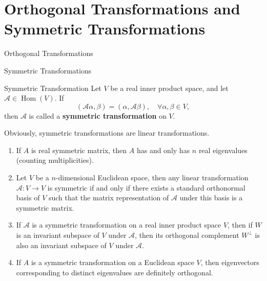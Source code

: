 \documentclass[11pt]{../../TexTemplate/elegantbook} %
\begin{document}
\section{Orthogonal Transformations and Symmetric Transformations}
\begin{leftbarTitle}{Orthogonal Transformations}\end{leftbarTitle}
\begin{leftbarTitle}{Symmetric Transformations}\end{leftbarTitle}
\begin{definition}{Symmetric Transformation}
    Let \( V \) be a real inner product space, 
    and let \( \mathcal{A}\in \operatorname{Hom}(V) \).
    If
    \[
    (\mathcal{A}\alpha, \beta) = (\alpha, \mathcal{A}\beta), \quad \forall \alpha, \beta \in V,
    \]
    then \( \mathcal{A} \) is called a \textbf{symmetric transformation} on \( V \).
\end{definition}
Obviously, symmetric transformations are linear transformations.

\begin{lemma}
    \begin{enumerate}
        \item If \( A \) is real symmetric matrix, then \( A \) has and only has \( n \) real eigenvalues (counting multiplicities). 
        \item Let \(V\) be a \(n\)-dimensional Euclidean space, 
            then any linear transformation \( \mathcal{A}: V \to V \) is symmetric if and only if
            there exists a standard orthonormal basis of \( V \) such that 
            the matrix representation of \( \mathcal{A} \) under this basis is a symmetric matrix.
        \item If \( \mathcal{A} \) is a symmetric transformation on a real inner product space \( V \),
            then if \(W\) is an invariant subspace of \( V \) under \( \mathcal{A} \),
            then its orthogonal complement \( W^{\perp} \) is also an invariant subspace of \( V \) under \( \mathcal{A} \).
        \item If \(A\) is a symmetric transformation on a Euclidean space \( V \),
            then eigenvectors corresponding to distinct eigenvalues are definitely orthogonal.
    \end{enumerate}
\end{lemma}
\end{document}
